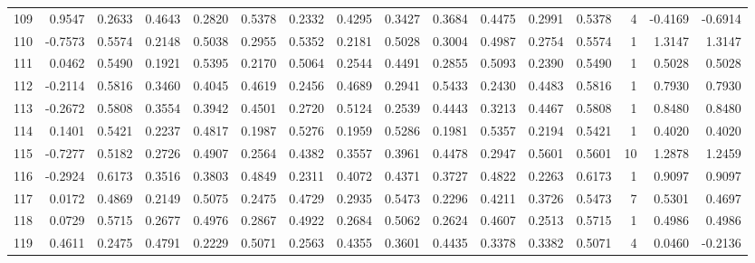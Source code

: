 \begin{tabular}{lrrrrrrrrrrrrrrr}
109 &      0.9547 &  0.2633 &  0.4643 &  0.2820 &  0.5378 &  0.2332 &  0.4295 &  0.3427 &  0.3684 &  0.4475 &   0.2991 &     0.5378 &      4 &                   -0.4169 &                    -0.6914 \\
110 &     -0.7573 &  0.5574 &  0.2148 &  0.5038 &  0.2955 &  0.5352 &  0.2181 &  0.5028 &  0.3004 &  0.4987 &   0.2754 &     0.5574 &      1 &                    1.3147 &                     1.3147 \\
111 &      0.0462 &  0.5490 &  0.1921 &  0.5395 &  0.2170 &  0.5064 &  0.2544 &  0.4491 &  0.2855 &  0.5093 &   0.2390 &     0.5490 &      1 &                    0.5028 &                     0.5028 \\
112 &     -0.2114 &  0.5816 &  0.3460 &  0.4045 &  0.4619 &  0.2456 &  0.4689 &  0.2941 &  0.5433 &  0.2430 &   0.4483 &     0.5816 &      1 &                    0.7930 &                     0.7930 \\
113 &     -0.2672 &  0.5808 &  0.3554 &  0.3942 &  0.4501 &  0.2720 &  0.5124 &  0.2539 &  0.4443 &  0.3213 &   0.4467 &     0.5808 &      1 &                    0.8480 &                     0.8480 \\
114 &      0.1401 &  0.5421 &  0.2237 &  0.4817 &  0.1987 &  0.5276 &  0.1959 &  0.5286 &  0.1981 &  0.5357 &   0.2194 &     0.5421 &      1 &                    0.4020 &                     0.4020 \\
115 &     -0.7277 &  0.5182 &  0.2726 &  0.4907 &  0.2564 &  0.4382 &  0.3557 &  0.3961 &  0.4478 &  0.2947 &   0.5601 &     0.5601 &     10 &                    1.2878 &                     1.2459 \\
116 &     -0.2924 &  0.6173 &  0.3516 &  0.3803 &  0.4849 &  0.2311 &  0.4072 &  0.4371 &  0.3727 &  0.4822 &   0.2263 &     0.6173 &      1 &                    0.9097 &                     0.9097 \\
117 &      0.0172 &  0.4869 &  0.2149 &  0.5075 &  0.2475 &  0.4729 &  0.2935 &  0.5473 &  0.2296 &  0.4211 &   0.3726 &     0.5473 &      7 &                    0.5301 &                     0.4697 \\
118 &      0.0729 &  0.5715 &  0.2677 &  0.4976 &  0.2867 &  0.4922 &  0.2684 &  0.5062 &  0.2624 &  0.4607 &   0.2513 &     0.5715 &      1 &                    0.4986 &                     0.4986 \\
119 &      0.4611 &  0.2475 &  0.4791 &  0.2229 &  0.5071 &  0.2563 &  0.4355 &  0.3601 &  0.4435 &  0.3378 &   0.3382 &     0.5071 &      4 &                    0.0460 &                    -0.2136 \\

\end{tabular}
